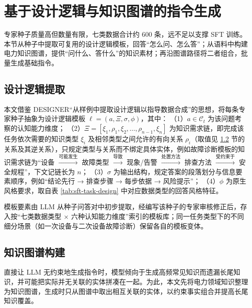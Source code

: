 \documentclass[fontset=fandol,type=master,campus=shenzhen,etitleauto=true]{hithesisbook}
\begin{document}
\section{基于设计逻辑与知识图谱的指令生成}\label{ux57faux4e8eux8bbeux8ba1ux903bux8f91ux63d0ux53d6ux4e0eux77e5ux8bc6ux56feux8c31ux7684ux4efbux52a1ux6570ux636eux751fux6210}

专家种子质量高但数量有限，七类数据合计约 600 条，远不足以支撑 SFT 训练。本节从种子中提取可复用的设计逻辑模板，回答“怎么问、怎么答”；从语料中构建电力知识图谱，提供“问什么、答什么”的知识素材；再沿图谱路径将二者组合，批量生成基础指令。

\subsection{设计逻辑提取}\label{ux4eceux4e13ux5bb6ux79cdux5b50ux4e2dux63d0ux53d6ux8bbeux8ba1ux903bux8f91}

本文借鉴 DESIGNER“从样例中提取设计逻辑以指导数据合成”的思想\cite{ref54}，将每条专家种子抽象为设计逻辑模板 $\ell = (a, \Xi, \sigma, \phi)$，其中：
（1）$a \in \mathcal{C}_t$ 为该问题考察的认知能力维度；
（2）$\Xi = [\xi_1, \rho_1, \xi_2, \ldots, \rho_{n-1}, \xi_n]$ 为知识需求链，即完成该任务依次需要的知识类型 $\xi_i$ 及相邻类型之间允许的有向关系 $\rho_i$（取值见 \ref{ux9762ux5411ux4e03ux7c7bux6570ux636eux7684ux7535ux529bux77e5ux8bc6ux56feux8c31ux6784ux5efa} 节的关系及其逆关系），只规定类型与关系而不绑定具体实体，例如故障诊断模板的知识需求链为“设备 $\xrightarrow{\text{可能发生}}$ 故障类型 $\xrightarrow{\text{导致}}$ 现象/告警 $\xrightarrow{\text{处置方法}}$ 排查方法 $\xrightarrow{\text{受约束于}}$ 安全规程”，下文记链长为 $n$；
（3）$\sigma$ 为输出结构，规定答案的段落划分与信息要素顺序，例如“结论先行 → 排查步骤 → 每步依据 → 风险提示”；
（4）$\phi$ 为原生风格要求，取自表 \ref{tab:sft-task-design} 中对应数据类型的回答风格特征。

模板要素由 LLM 从种子问答对中初步提取，经编写该种子的专家审核修正后，存入按“七类数据类型 × 六种认知能力维度”索引的模板库；同一任务类型下的不同细分场景（如一次设备与二次设备故障诊断）保留各自的模板变体。

\subsection{知识图谱构建}\label{ux9762ux5411ux4e03ux7c7bux6570ux636eux7684ux7535ux529bux77e5ux8bc6ux56feux8c31ux6784ux5efa}

直接让 LLM 无约束地生成指令时，模型倾向于生成高频常见知识而遗漏长尾知识，并可能把实际并无关联的实体拼凑在一起。为此，本文先将电力领域知识整理为知识图谱，生成时只从图谱中取出相互关联的实体，以约束事实组合并提高长尾知识覆盖。
\end{document}
